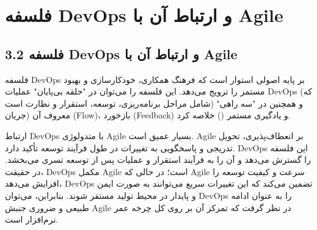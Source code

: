 \section{فلسفه DevOps و ارتباط آن با Agile}
\subsection*{3.2 فلسفه DevOps و ارتباط آن با Agile}
فلسفه DevOps بر پایه اصولی استوار است که فرهنگ همکاری، خودکارسازی و بهبود مستمر را ترویج می‌دهد. این فلسفه را می‌توان در "حلقه بی‌پایان" عملیات DevOps (که شامل مراحل برنامه‌ریزی، توسعه، استقرار و نظارت است) و همچنین در "سه راهی" معروف آن (جریان (Flow)، بازخورد (Feedback) و یادگیری مستمر () خلاصه کرد.

ارتباط DevOps با متدولوژی Agile بسیار عمیق است. Agile بر انعطاف‌پذیری، تحویل تدریجی و پاسخگویی به تغییرات در طول فرآیند توسعه تأکید دارد. DevOps این فلسفه را گسترش می‌دهد و آن را به فرآیند استقرار و عملیات پس از توسعه تسری می‌بخشد. در حقیقت، DevOps مکمل Agile است؛ در حالی که Agile سرعت و کیفیت توسعه را افزایش می‌دهد، DevOps تضمین می‌کند که این تغییرات سریع می‌توانند به صورت ایمن و پایدار در محیط تولید مستقر شوند. بنابراین، می‌توان DevOps را به عنوان ادامه طبیعی و ضروری جنبش Agile در نظر گرفت که تمرکز آن بر روی کل چرخه عمر نرم‌افزار است.

